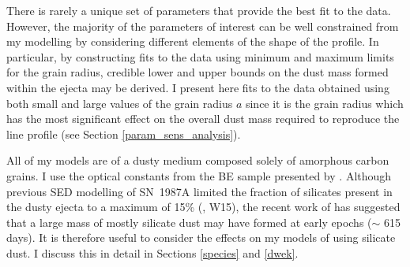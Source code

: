 There is rarely a unique set of parameters that provide the best fit to 
the data.  However, the majority of the parameters of interest can be well 
constrained from my modelling by considering different elements of the 
shape of the profile.  In particular, by constructing fits to the data 
using minimum and maximum limits for the grain radius, credible lower and 
upper bounds on the dust mass formed within the ejecta may be derived.  
I present here fits to the data obtained using both small and large 
values of the grain radius $a$ since it is the grain radius which has the 
most significant effect on the overall dust mass required to reproduce the 
line profile (see Section \ref{param_sens_analysis}).


All of my models are of a dusty medium composed solely of amorphous 
carbon grains. I use the optical constants from the BE sample presented 
by \citet{Zubko1996}.  Although previous SED modelling of SN~1987A  
limited the fraction of silicates present in the dusty ejecta to a maximum 
of 15\% (\citet{Ercolano2007}, W15), the recent work of \citet{Dwek2015} has suggested that a large mass of mostly silicate dust may have formed at early epochs ($\sim$ 615 days).  It is therefore useful to consider the effects 
on my models of using silicate dust.  I discuss this in detail in 
Sections \ref{species} and \ref{dwek}.



